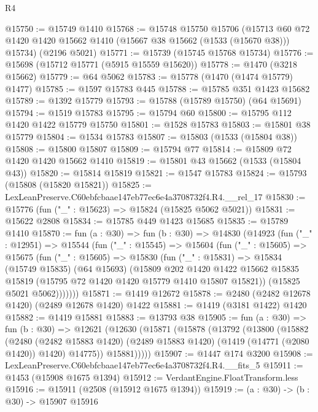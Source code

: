 \begin{lexlean}{R4}
\begin{coremodule}
@15750 := @15749 @1410
@15768 := @15748
    @15750
    @15706
    (@15713 @60 @72 @1420 @1420 @15662 @1410 (@15667 @38 @15662 (@1533 (@15670 @38))) @15734)
    (@2196 @5021)
@15771 := @15739 (@15745 @15768 @15734)
@15776 := @15698 (@15712 @15771 (@5915 @15559 @15620))
@15778 := @1470 (@3218 @15662)
@15779 := @64 @5062
@15783 := @15778 (@1470 (@1474 @15779) @1477)
@15785 := @1597 @15783 @445
@15788 := @15785 @351 @1423 @15682
@15789 := @1392 @15779
@15793 := @15788 (@15789 @15750) (@64 @15691)
@15794 := @1519 @15783
@15795 := @15794 @60
@15800 := @15795 @112 @1420 @1422 @15779 @15750
@15801 := @1528 @15783
@15803 := @15801 @38 @15779
@15804 := @1534 @15783
@15807 := @15803 (@1533 (@15804 @38))
@15808 := @15800 @15807
@15809 := @15794 @77
@15814 := @15809 @72 @1420 @1420 @15662 @1410
@15819 := @15801 @43 @15662 (@1533 (@15804 @43))
@15820 := @15814 @15819
@15821 := @1547 @15783
@15824 := @15793 (@15808 (@15820 @15821))
@15825 := LexLeanPreserve.C60ebfcbaae147eb77ec6e4a3708732f4.R4.__rel_17
@15830 := @15776 (fun ("_" : @15623) => @15824 (@15825 @5062 @5021))
@15831 := @15622 @2808
@15834 := @15785 @449 @1423 @15685
@15835 := @15789 @1410
@15870 := fun (a : @30) =>
  fun (b : @30) =>
  @14830
    (@14923
      (fun ("_" : @12951) =>
      @15544
        (fun ("_" : @15545) =>
        @15604
          (fun ("_" : @15605) =>
          @15675
            (fun ("_" : @15605) =>
            @15830
              (fun ("_" : @15831) =>
              @15834
                (@15749 @15835)
                (@64 @15693)
                (@15809
                  @202
                  @1420
                  @1422
                  @15662
                  @15835
                  @15819
                  (@15795 @72 @1420 @1420 @15779 @1410 @15807 @15821))
                (@15825 @5021 @5062)))))))
@15871 := @1419 @12672
@15878 := @2480 (@2482 @12678 @1420) (@2489 @12678 @1420) @1422
@15881 := @1419 (@3181 @1422) @1420
@15882 := @1419 @15881
@15883 := @13793 @38
@15905 := fun (a : @30) =>
  fun (b : @30) =>
  @12621
    (@12630
      (@15871
        (@15878
          (@13792
            (@13800
              (@15882
                (@2480
                  (@2482 @15883 @1420)
                  (@2489 @15883 @1420)
                  (@1419 (@14771 (@2080 @1420)) @1420)
                  @14775))
              @15881)))))
@15907 := @1447 @174 @3200
@15908 := LexLeanPreserve.C60ebfcbaae147eb77ec6e4a3708732f4.R4.__fits_5
@15911 := @1453 (@15908 @1675 @1394)
@15912 := VerdantEngine.FloatTransform.less
@15916 := @15911 (@2508 (@15912 @1675 @1394))
@15919 := (a : @30) -> (b : @30) -> @15907 @15916

\end{coremodule}
\end{lexlean}
